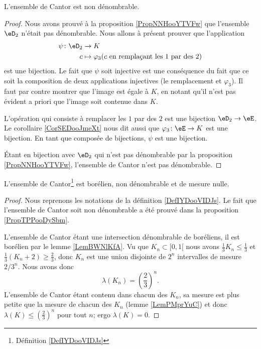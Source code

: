 \begin{proposition}\label{PropTPPooDySbm}
    L'ensemble de Cantor est non dénombrable.
\end{proposition}

\begin{proof}

    Nous avons prouvé à la proposition \ref{PropNNHooYTVFw} que l'ensemble \( \eD_2\) n'était pas dénombrable. Nous allons à présent prouver que l'application
    \begin{equation}
        \begin{aligned}
            \psi\colon \eD_2&\to K \\
            c&\mapsto \varphi_3(   c\text{ en remplaçant les } 1\text{ par des } 2  ) 
        \end{aligned}
    \end{equation}
    est une bijection. Le fait que \( \psi\) soit injective est une conséquence du fait que ce soit la composition de deux applications injectives (le remplacement et \( \varphi_3\)). Il faut par contre montrer que l'image est égale à \( K\), en notant qu'il n'est pas évident a priori que l'image soit contenue dans \( K\).

    L'opération qui consiste à remplacer les \( 1\) par des \( 2\) est une bijection \( \eD_2\to \eE\). Le corollaire \ref{CorSEDooJmeXt} nous dit aussi que \( \varphi_3\colon \eE\to K\) est une bijection. En tant que composée de bijections, \( \psi\) est une bijection.

    Étant en bijection avec \( \eD_2\) qui n'est pas dénombrable par la proposition \ref{PropNNHooYTVFw}, l'ensemble de Cantor n'est pas dénombrable.
\end{proof}

\begin{proposition}    \label{PropBEWooXZdKN}
    L'ensemble de Cantor\footnote{Définition \ref{DefIYDooVIDJs}} est borélien, non dénombrable et de mesure nulle.
\end{proposition}

\begin{proof}
    Nous reprenons les notations de la définition \ref{DefIYDooVIDJs}. Le fait que l'ensemble de Cantor soit non dénombrable a été prouvé dans la proposition \ref{PropTPPooDySbm}.

    L'ensemble de Cantor étant une intersection dénombrable de boréliens, il est borélien par le lemme \ref{LemBWNlKfA}. Vu que \( K_n\subset\mathopen[ 0 , 1 [\) nous avons \( \frac{1}{ 3 }K_n\leq \frac{1}{ 3 }\) et \( \frac{1}{ 3 }(K_n+2)\geq \frac{ 2 }{ 3 }\), donc \( K_n\) est une union disjointe de \( 2^n\) intervalles de mesure \( 2/3^n\). Nous avons donc
        \begin{equation}
            \lambda(K_n)=\left( \frac{ 2 }{ 3 } \right)^n.
        \end{equation}
        L'ensemble de Cantor étant contenu dans chacun des \( K_n\), sa mesure est plus petite que la mesure de chacun des \( K_n\) (lemme \ref{LemPMprYuC}) et donc \( \lambda(K)\leq \left( \frac{ 2 }{ 3 } \right)^n\) pour tout \( n\); ergo \( \lambda(K)=0\).
\end{proof}

